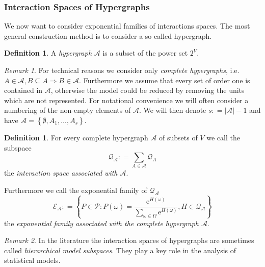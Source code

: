 \documentclass[12pt]{amsart}
\newcommand{\set}[1]{\left\lbrace #1 \right\rbrace} %
\newcommand{\defas}{\mathrel{\mathop{:}}=}   %
\renewcommand{\subset}{\subseteq}  %
\providecommand{\abs}[1]{\left\lvert#1\right\rvert}
\newcommand{\e}{\mathrm{e}} %
\newcommand{\ie}{i.e.\;}  %
\theoremstyle{plain}%
\theoremstyle{definition}
\newtheorem{defn}[thm]{Definition}
\theoremstyle{remark}
\newtheorem*{rem}{Remark}
\begin{document}
\subsubsection{Interaction Spaces of Hypergraphs}
We now want to consider exponential families of interactions spaces.
The most general construction method is to consider a so called
hypergraph.

\begin{defn}
  A \emph{hypergraph} $\mathcal{A}$ is a subset of
  the power set $2^V$.
\end{defn}

\begin{rem}
  For technical reasons we consider only \emph{complete hypergraphs},
   \ie $A\in \mathcal{A}, B\subset A
  \Rightarrow B\in\mathcal{A}$. Furthermore we assume that every set
  of order one is contained in $\mathcal{A}$, otherwise the model
  could be reduced by removing the units which are not represented.
  For notational convenience we will often consider a numbering of the
  non-empty elements of $\mathcal{A}$. We will then denote $s \defas
  \abs{\mathcal{A}}-1$ and have $\mathcal{A} = \set{\emptyset,
    A_1,\ldots,A_s}$. 
\end{rem}


\begin{defn}
  For every complete hypergraph $\mathcal{A}$ of subsets of $V$ we
  call the subspace
\begin{equation*}
  \label{eq:definitionofhierarchicalsubspaces}
  \mathcal{Q}_\mathcal{A} \defas \sum_{A\in\mathcal{A}} \mathcal{Q}_A
\end{equation*}  
the \emph{interaction space associated with $\mathcal{A}$}.  

Furthermore we call the exponential family of
$\mathcal{Q}_\mathcal{A}$
\begin{equation*}
  \mathcal{E}_{\mathcal{A}} \defas
  \set { P \in \mathcal{P} : P(\omega)= \frac{\e^{H(\omega)}}
    {\sum_{\omega\in\Omega} \e^{H(\omega)}} , H \in \mathcal{Q}_\mathcal{A}} 
\end{equation*} 
the \emph{exponential family associated with the complete hypergraph
$\mathcal{A}$}. 
\end{defn}

\begin{rem} In the literature the interaction spaces of hypergraphs
  are sometimes called \emph{hierarchical model subspaces}.
   They play a key role in the
  analysis of statistical models. 
\end{rem}
\end{document}
